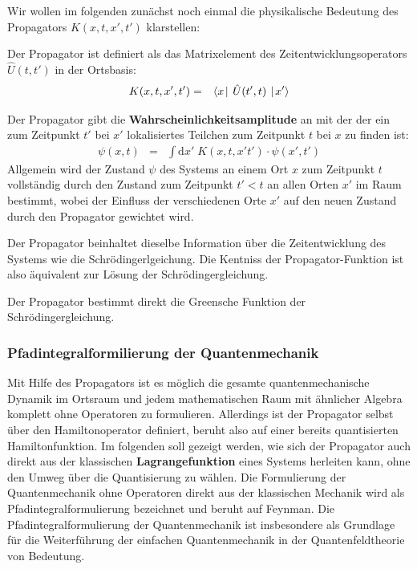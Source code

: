 Wir wollen im folgenden zunächst noch einmal die physikalische Bedeutung des Propagators $K(x,t,x',t')$ klarstellen: 
\begin{itemize1}
	\item Der Propagator ist definiert als das Matrixelement des Zeitentwicklungsoperators $\hat{U}(t,t')$ in der Ortsbasis: 
	\vspace{-2ex}\begin{eqnarray*}
		K(x,t,x',t') &=& \bracket{x}{\;\hat{U}(t',t)\;}{x'}
	\end{eqnarray*}\vspace{-5ex}
	\item Der Propagator gibt die {\bf Wahrscheinlichkeitsamplitude} an mit der der ein zum Zeitpunkt $t'$ bei $x'$ lokalisiertes Teilchen zum Zeitpunkt $t$ bei $x$ zu finden ist: 
	\begin{eqnarray*}
		\psi(x,t) &=& \int\mathrm{d}x'\; K(x,t,x't') \cdot\psi(x',t')
	\end{eqnarray*}
	Allgemein wird der Zustand $\psi$ des Systems an einem Ort $x$ zum Zeitpunkt $t$ vollständig durch den Zustand zum Zeitpunkt $t'<t$ an allen Orten $x'$ im Raum bestimmt, wobei der Einfluss der verschiedenen Orte $x'$ auf den neuen Zustand durch den Propagator gewichtet wird. 
	\item Der Propagator beinhaltet dieselbe Information über die Zeitentwicklung des Systems wie die Schrödingerlgeichung. Die Kentniss der Propagator-Funktion ist also äquivalent zur Lösung der Schrödingergleichung. 
	\item Der Propagator bestimmt direkt die Greensche Funktion der Schrödingergleichung. 
\end{itemize1}


\subsubsection{Pfadintegralformilierung der Quantenmechanik}

Mit Hilfe des Propagators ist es möglich die gesamte quantenmechanische Dynamik im Ortsraum und jedem mathematischen Raum mit ähnlicher Algebra komplett ohne Operatoren zu formulieren. Allerdings ist der Propagator selbst über den Hamiltonoperator definiert, beruht also auf einer bereits quantisierten Hamiltonfunktion. Im folgenden soll gezeigt werden, wie sich der Propagator auch direkt aus der klassischen {\bf Lagrangefunktion} eines Systems herleiten kann, ohne den Umweg über die Quantisierung zu wählen. Die Formulierung der Quantenmechanik ohne Operatoren direkt aus der klassischen Mechanik wird als Pfadintegralformulierung bezeichnet und beruht auf Feynman. Die Pfadintegralformulierung der Quantenmechanik ist insbesondere als Grundlage für die Weiterführung der einfachen Quantenmechanik in der Quantenfeldtheorie von Bedeutung. 


